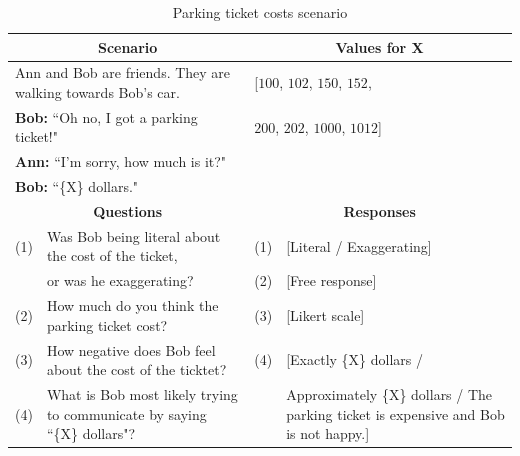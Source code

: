 \documentclass{article} %
\begin{document}
\begin{table}[h]
\begin{tabular}{| p{0.15cm}  p{8.15cm}| p{0.15cm}p{4cm} |}\hline
\multicolumn{2}{|c|}{\textbf{Scenario}} & \multicolumn{2}{c|}{\textbf{Values for X}} \\\hline
\multicolumn{2}{|l|}{Ann and Bob are friends. They are walking towards Bob's car.} & \multicolumn{2}{l|}{[$100$, $102$, $150$, $152$,}\\
\multicolumn{2}{|l|}{\textbf{Bob:} ``Oh no, I got a parking ticket!"} &
\multicolumn{2}{l|}{$200$, $202$, $1000$, $1012$]}\\
\multicolumn{2}{|l|}{\textbf{Ann:} ``I'm sorry, how much is it?"} & \multicolumn{2}{l|}{}\\
\multicolumn{2}{|l|}{\textbf{Bob:} ``\{X\} dollars."} & \multicolumn{2}{l|}{}\\\hline
\multicolumn{2}{|c|}{\textbf{Questions}} & \multicolumn{2}{c|}{\textbf{Responses}} \\\hline
(1) & Was Bob being literal about the cost of the ticket, & (1) &[Literal / Exaggerating] \\
 & or was he exaggerating? & (2) & [Free response] \\
(2) & How much do you think the parking ticket cost? & (3) & [Likert scale] \\
(3) & How negative does Bob feel about the cost of the ticktet? & (4) & [Exactly \{X\} dollars / \\
(4) & What is Bob most likely trying to communicate by saying  ``\{X\} dollars"? & & Approximately \{X\} dollars / The parking ticket is expensive and Bob is not happy.]\\\hline
\end{tabular}
\caption{Parking ticket costs scenario}
\label{tab:parkingtable}
\end{table}
\end{document}
